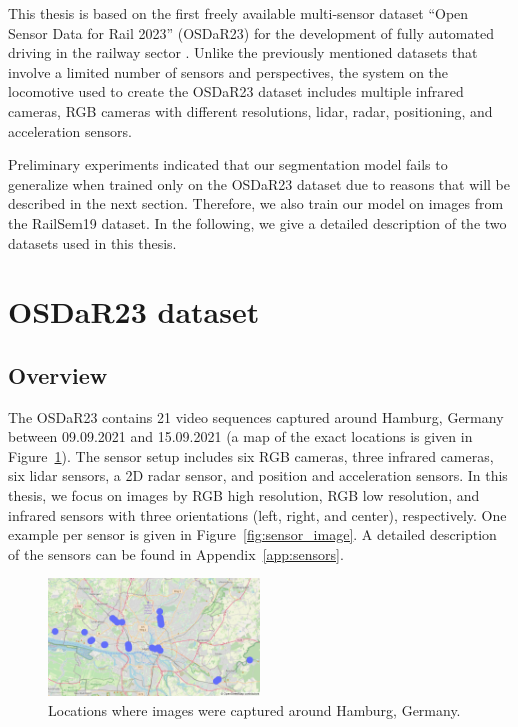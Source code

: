 \documentclass[Master,MDS,english]{BASE/twbook} %
\begin{document}
This thesis is based on the first freely available multi-sensor dataset ``Open Sensor Data for Rail 2023'' (OSDaR23) for the development of fully automated driving in the railway sector \citep{DB2023, tagiew2023osdar23}.
Unlike the previously mentioned datasets that involve a limited number of sensors and perspectives, the system on the locomotive used to create the OSDaR23 dataset includes multiple infrared cameras, RGB cameras with different resolutions, lidar, radar, positioning, and acceleration sensors.

Preliminary experiments indicated that our segmentation model fails to generalize when trained only on the OSDaR23 dataset due to reasons that will be described in the next section. Therefore, we also train our model on images from the RailSem19 dataset.
In the following, we give a detailed description of the two datasets used in this thesis.


\section{OSDaR23 dataset} \label{sec:OSDaR23}

\subsection{Overview}

The OSDaR23 contains 21 video sequences captured around Hamburg, Germany between 09.09.2021 and 15.09.2021 (a map of the exact locations is given in Figure~\ref{fig:map}). 
The sensor setup includes six RGB cameras, three infrared cameras, six lidar sensors, a 2D radar sensor, and position and acceleration sensors. In this thesis, we focus on images by RGB high resolution, RGB low resolution, and infrared sensors with three orientations (left, right, and center), respectively. One example per sensor is given in Figure~\ref{fig:sensor_image}. A detailed description of the sensors can be found in Appendix~\ref{app:sensors}.

\begin{figure}[H]
\centering
\includegraphics[width=0.5\textwidth]{images/datasets/db/map}
\caption{Locations where images were captured around Hamburg, Germany. }
\label{fig:map}
\end{figure}
\end{document}
